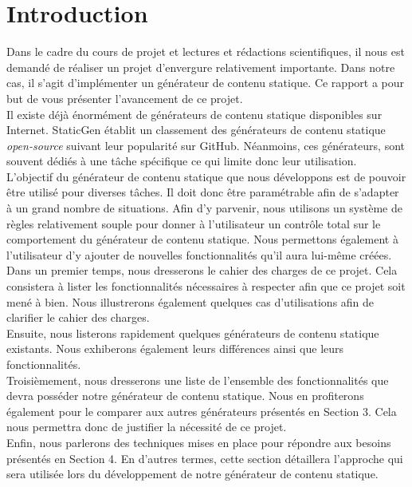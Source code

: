 \section{Introduction}

	Dans le cadre du cours de projet et lectures et rédactions scientifiques, il nous est demandé de réaliser un projet d'envergure relativement importante. Dans notre cas, il s'agit d'implémenter un générateur de contenu statique. Ce rapport a pour but de vous présenter l'avancement de ce projet.\\
	
	Il existe déjà énormément de générateurs de contenu statique  disponibles sur Internet. StaticGen \cite{StaticGen} établit un classement des générateurs de contenu statique \textit{open-source} suivant leur popularité sur GitHub. Néanmoins, ces générateurs, sont souvent dédiés à une tâche spécifique ce qui limite donc leur utilisation.\\
	
	L'objectif du générateur de contenu statique que nous développons est de pouvoir être utilisé pour diverses tâches. Il doit donc être paramétrable afin de s'adapter à un grand nombre de situations. Afin d'y parvenir, nous utilisons un système de règles relativement souple pour donner à l'utilisateur un contrôle total sur le comportement du générateur de contenu statique. Nous permettons également à l'utilisateur d'y ajouter de nouvelles fonctionnalités qu'il aura lui-même créées.\\
	
	Dans un premier temps, nous dresserons le cahier des charges de ce projet. Cela consistera à lister les fonctionnalités nécessaires à respecter afin que ce projet soit mené à bien. Nous illustrerons également quelques cas d'utilisations afin de clarifier le cahier des charges.\\
	
	Ensuite, nous listerons rapidement quelques générateurs de contenu statique existants. Nous exhiberons également leurs différences ainsi que leurs fonctionnalités.\\
	
	Troisièmement, nous dresserons une liste de l'ensemble des fonctionnalités que devra posséder notre générateur de contenu statique. Nous en profiterons également pour le comparer aux autres générateurs présentés en Section 3. Cela nous permettra donc de justifier la nécessité de ce projet.\\
	
	Enfin, nous parlerons des techniques mises en place pour répondre aux besoins présentés en Section 4. En d'autres termes, cette section détaillera l'approche qui sera utilisée lors du développement de notre générateur de contenu statique.

	